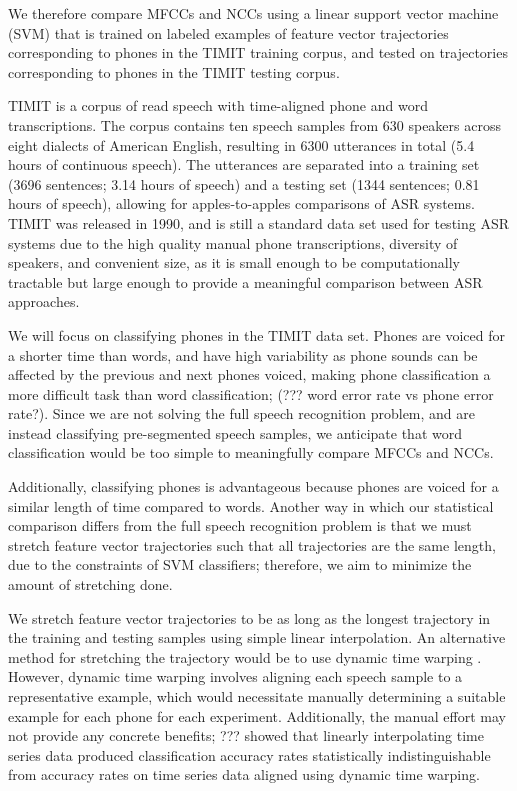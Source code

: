We therefore compare MFCCs and NCCs
using a linear support vector machine (SVM)
that is trained on labeled
examples of feature vector trajectories
corresponding to phones
in the TIMIT training corpus,
and tested on trajectories
corresponding to phones
in the TIMIT testing corpus.

TIMIT \citep{garofolo1993} is a corpus of read speech
with time-aligned phone and word transcriptions.
The corpus contains ten speech samples
from 630 speakers across eight dialects
of American English,
resulting in 6300 utterances in total
(5.4 hours of continuous speech).
The utterances are separated into
a training set
(3696 sentences; 3.14 hours of speech)
and a testing set
(1344 sentences; 0.81 hours of speech),
allowing for apples-to-apples
comparisons of ASR systems.
TIMIT was released in 1990,
and is still a standard data set used
for testing ASR systems
due to the high quality
manual phone transcriptions,
diversity of speakers,
and convenient size,
as it is small enough to be
computationally tractable
but large enough to
provide a meaningful comparison
between ASR approaches.

We will focus on classifying
phones in the TIMIT data set.
Phones are voiced
for a shorter time than words,
and have high variability
as phone sounds can be affected
by the previous and next phones voiced,
making phone classification
a more difficult task than word classification;
(??? word error rate vs phone error rate?).
Since we are not solving the full
speech recognition problem,
and are instead classifying
pre-segmented speech samples,
we anticipate that word classification
would be too simple to meaningfully
compare MFCCs and NCCs.

Additionally, classifying phones
is advantageous because phones
are voiced for a similar length of time
compared to words.
Another way in which our statistical comparison
differs from the full speech recognition problem
is that we must stretch
feature vector trajectories
such that all trajectories are the same length,
due to the constraints of SVM classifiers;
therefore,
we aim to minimize the amount
of stretching done.

We stretch feature vector trajectories
to be as long as the longest trajectory
in the training and testing samples
using simple linear interpolation.
An alternative method
for stretching the trajectory
would be to use dynamic time warping
\citep{ratanamahatana2004}.
However, dynamic time warping
involves aligning each speech sample
to a representative example,
which would necessitate manually
determining a suitable example
for each phone for each experiment.
Additionally, the manual effort may not
provide any concrete benefits;
??? showed that linearly interpolating
time series data
produced classification accuracy rates
statistically indistinguishable
from accuracy rates on time series data
aligned using dynamic time warping.

